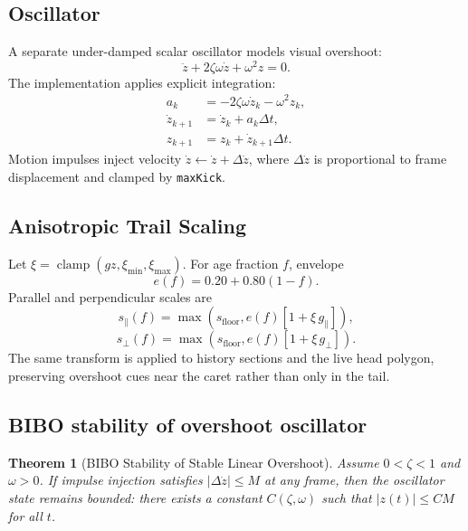 \documentclass[journal]{IEEEtran}
\newtheorem{theorem}{Theorem}
\begin{document}
\subsection{Oscillator}
A separate under-damped scalar oscillator models visual overshoot:
\begin{equation}
\ddot{z}+2\zeta\omega\dot{z}+\omega^2 z=0.
\end{equation}
The implementation applies explicit integration:
\begin{equation}
\begin{aligned}
a_k &= -2\zeta\omega \dot{z}_k - \omega^2 z_k, \\
\dot{z}_{k+1} &= \dot{z}_k + a_k\Delta t, \\
z_{k+1} &= z_k + \dot{z}_{k+1}\Delta t.
\end{aligned}
\end{equation}
Motion impulses inject velocity \(\dot{z}\leftarrow \dot{z}+\Delta \dot{z}\), where \(\Delta \dot{z}\) is proportional to frame displacement and clamped by \texttt{maxKick}.

\subsection{Anisotropic Trail Scaling}
Let \(\xi=\operatorname{clamp}(g z,\xi_{\min},\xi_{\max})\). For age fraction \(f\), envelope
\begin{equation}
e(f)=0.20+0.80(1-f).
\end{equation}
Parallel and perpendicular scales are
\begin{equation}
s_{\parallel}(f)=\max(s_{\text{floor}}, e(f)\left[1+\xi\,g_{\parallel}\right]),
\end{equation}
\begin{equation}
s_{\perp}(f)=\max(s_{\text{floor}}, e(f)\left[1+\xi\,g_{\perp}\right]).
\end{equation}
The same transform is applied to history sections and the live head polygon, preserving overshoot cues near the caret rather than only in the tail.

\subsection{BIBO stability of overshoot oscillator}

\begin{theorem}[BIBO Stability of Stable Linear Overshoot]
Assume \(0<\zeta<1\) and \(\omega>0\). If impulse injection satisfies \(|\Delta \dot{z}|\le M\) at any frame, then the oscillator state remains bounded: there exists a constant \(C(\zeta,\omega)\) such that \(|z(t)|\le C M\) for all \(t\).
\end{theorem}
\end{document}
